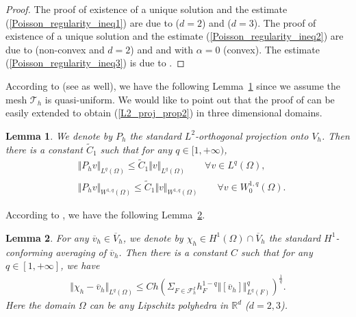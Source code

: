 \documentclass[12pt]{amsart}
\newtheorem{lemma}{Lemma}[section]
\theoremstyle{definition}
\theoremstyle{remark}
\begin{document}
\begin{proof}
The proof of existence of a unique solution and the estimate 
(\ref{Poisson_regularity_ineq1}) are due to 
\cite[Proposition~$2.1$]{ChibaSaito2019} ($d=2$) and 
\cite[($1.6$)]{Fromm1992} ($d=3$). 
The proof of existence of a unique solution and the estimate 
(\ref{Poisson_regularity_ineq2}) are due to 
\cite[Theorem~$0.5$]{JerisonKenig1995} (non-convex and $d=2$) and 
\cite[($1.5$)]{Fromm1992} and \cite[Theorem~$2.3$]{Wood2006} with $\alpha = 0$ (convex). 
The estimate (\ref{Poisson_regularity_ineq3}) 
is due to \cite[Lemma~$1$]{SmearsSuli2013}.
\end{proof}

According to \cite[Theorem~$3$ and Theorem~$4$]{CrouzeixThomee1987} (see \cite[Lemma~$7.3$]{Wahlbin1991} as well), 
we have the following Lemma~\ref{lemma_L2_proj_props} since we assume the mesh $\mathcal{T}_{h}$ is quasi-uniform. 
We would like to point out that the proof of \cite[Theorem~$4$]{CrouzeixThomee1987} can be easily extended to obtain 
(\ref{L2_proj_prop2}) in three dimensional domains.

\begin{lemma}
\label{lemma_L2_proj_props}
We denote by $P_{h}$ the standard $L^{2}$-orthogonal projection onto $V_{h}$. Then 
there is a constant $\tilde{C}_{1}$ such that for any $q \in [1, +\infty)$,
\begin{subequations}
\label{L2_proj_props}
\begin{align}
\label{L2_proj_prop1}
& \Vert P_{h} v\Vert_{L^{q}(\Omega)} \leq \tilde{C}_{1} \Vert v\Vert_{L^{q}(\Omega)} 
\qquad \forall v \in L^{q}(\Omega), \\
\label{L2_proj_prop2}
& \Vert P_{h} v\Vert_{W^{1,q}(\Omega)} \leq \tilde{C}_{1} \Vert v\Vert_{W^{1,q}(\Omega)} 
\qquad \forall v \in W_{0}^{1,q}(\Omega).
\end{align}
\end{subequations}
\end{lemma}

According to \cite[Lemma~$4.3$]{ErnGuermond2017}, we have the following Lemma~\ref{lemma_H1_interpolation}.
\begin{lemma}
\label{lemma_H1_interpolation} 
For any $\overline{v}_{h} \in \overline{V}_{h}$, we denote by $\chi_{h} \in H^{1}(\Omega)\cap 
\overline{V}_{h}$ the standard $H^{1}$-conforming averaging of $\overline{v}_{h}$. Then 
there is a constant $C$ such that for any $q \in [1,+\infty]$, we have  
\begin{align*}
\Vert \chi_{h} - \overline{v}_{h} \Vert_{L^{q}(\Omega)} 
\leq C h \left( \Sigma_{F \in \mathcal{F}_{h}^{I}} h_{F}^{1-q}\Vert [ \overline{v}_{h}] \Vert_{L^{q}(F)}^{q}
 \right)^{\frac{1}{q}}.
\end{align*}
Here the domain $\Omega$ can be any Lipschitz polyhedra in $\mathbb{R}^{d}$ ($d=2,3$).
\end{lemma}
\end{document}
